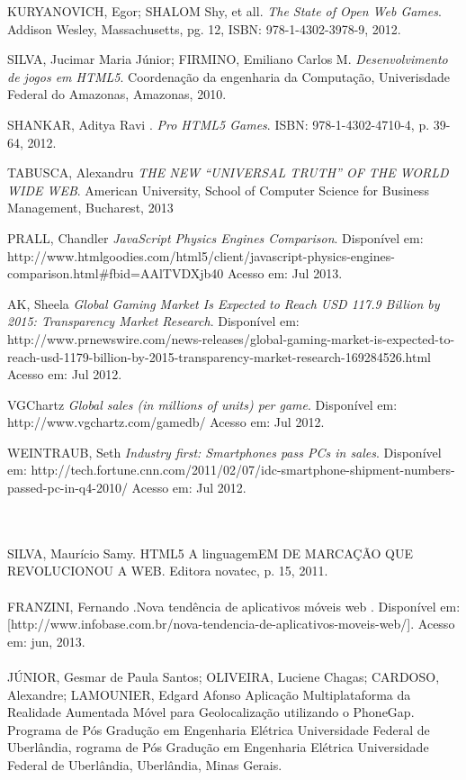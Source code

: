 \documentclass{article}
\begin{document}
\begin{thebibliography}{99}

  KURYANOVICH, Egor; SHALOM Shy, et all.
  \emph{The State of Open Web Games}.
  Addison Wesley, Massachusetts, pg. 12,
  ISBN: 978-1-4302-3978-9,
  2012.

SILVA, Jucimar Maria Júnior; FIRMINO, Emiliano Carlos M.
  \emph{Desenvolvimento de jogos em HTML5}.
  Coordenação da engenharia da Computação,
  Univerisdade Federal do Amazonas, 
  Amazonas, 2010.

SHANKAR, Aditya Ravi .
  \emph{Pro HTML5 Games}.
 ISBN: 978-1-4302-4710-4, p. 39-64, 
 2012.  

TABUSCA, Alexandru
  \emph{THE NEW “UNIVERSAL TRUTH” OF THE WORLD WIDE WEB}.
American University, School of Computer Science for
Business Management, Bucharest, 2013

PRALL, Chandler 
  \emph{JavaScript Physics Engines Comparison}.
Disponível em: http://www.htmlgoodies.com/html5/client/javascript-physics-engines-comparison.html#fbid=AAlTVDXjb40
Acesso em: Jul 2013.
 
AK, Sheela 
  \emph{ Global Gaming Market Is Expected to Reach USD 117.9 Billion by 2015: Transparency Market Research}.
Disponível em: http://www.prnewswire.com/news-releases/global-gaming-market-is-expected-to-reach-usd-1179-billion-by-2015-transparency-market-research-169284526.html
Acesso em: Jul 2012.

VGChartz
  \emph{Global sales (in millions of units) per game}.
Disponível em: http://www.vgchartz.com/gamedb/
Acesso em: Jul 2012.


WEINTRAUB, Seth
  \emph{Industry first: Smartphones pass PCs in sales}.
Disponível em: http://tech.fortune.cnn.com/2011/02/07/idc-smartphone-shipment-numbers-passed-pc-in-q4-2010/
Acesso em: Jul 2012.

\end{thebibliography}
\\
\\
SILVA, Maurício Samy. HTML5 A linguagemEM DE MARCAÇÃO QUE REVOLUCIONOU A WEB. Editora novatec, p. 15, 2011.
\\
\\
 FRANZINI, Fernando .Nova tendência de aplicativos móveis web .  Disponível em: 
[http://www.infobase.com.br/nova-tendencia-de-aplicativos-moveis-web/]. Acesso em: jun, 
2013.
\\
\\
JÚNIOR, Gesmar de Paula Santos; OLIVEIRA, Luciene Chagas; CARDOSO, Alexandre; LAMOUNIER, Edgard Afonso Aplicação Multiplataforma da Realidade Aumentada Móvel para Geolocalização utilizando o PhoneGap. Programa de Pós Gradução em Engenharia Elétrica
Universidade Federal de Uberlândia, rograma de Pós Gradução em Engenharia Elétrica
Universidade Federal de Uberlândia, Uberlândia, Minas Gerais.
\newpage 
\end{document}

